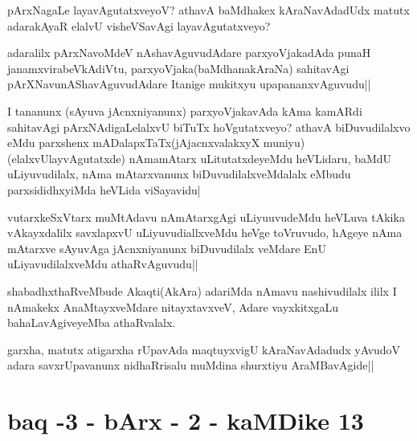 
\begin{artha}
pArxNagaLe layavAgutatxveyoV? athavA baMdhakex kAraNavAdadUdx matutx adarakAyaR elalvU 
visheVSavAgi layavAgutatxveyo?
\end{artha}

\begin{artha}
adaralilx pArxNavoMdeV nAshavAguvudAdare parxyoVjakadAda punaH janamxvirabeVkAdiVtu, parxyoVjaka(baMdhanakAraNa) sahitavAgi pArXNavunAShavAguvudAdare Itanige mukitxyu upapananxvAguvudu||
\end{artha}

\begin{artha}
I tananunx (sAyuva jAcnxniyanunx) parxyoVjakavAda kAma kamARdi sahitavAgi pArxNAdigaLelalxvU biTuTx hoVgutatxveyo? athavA biDuvudilalxvo eMdu parxshenx mADalapxTaTx(jAjacnxvalakxyX muniyu)(elalxvUlayvAgutatxde) nAmamAtarx uLitutatxdeyeMdu heVLidaru, baMdU uLiyuvudilalx, nAma mAtarxvanunx biDuvudilalxveMdalalx eMbudu parxsididhxyiMda heVLida viSayavidu|
\end{artha}

\begin{artha}
vutarxkeSxVtarx muMtAdavu nAmAtarxgAgi uLiyuuvudeMdu heVLuva tAkika vAkayxdalilx savxlapxvU uLiyuvudiallxveMdu heVge toVruvudo, hAgeye nAma mAtarxve sAyuvAga jAcnxniyanunx biDuvudilalx veMdare EnU uLiyavudilalxveMdu athaRvAguvudu||
\end{artha}


\begin{artha}
shabadhxthaRveMbude Akaqti(AkAra) adariMda nAmavu nashivudilalx ililx I nAmakekx AnaMtayxveMdare nitayxtavxveV, Adare vayxkitxgaLu bahaLavAgiveyeMba athaRvalalx.
\end{artha}


\begin{artha}
garxha, matutx atigarxha rUpavAda maqtuyxvigU kAraNavAdadudx yAvudoV adara savxrUpavanunx nidhaRrisalu muMdina shurxtiyu AraMBavAgide||
\end{artha}

\section*{baq -3 - bArx - 2 - kaMDike 13}

\begin{center}
\end{center}

